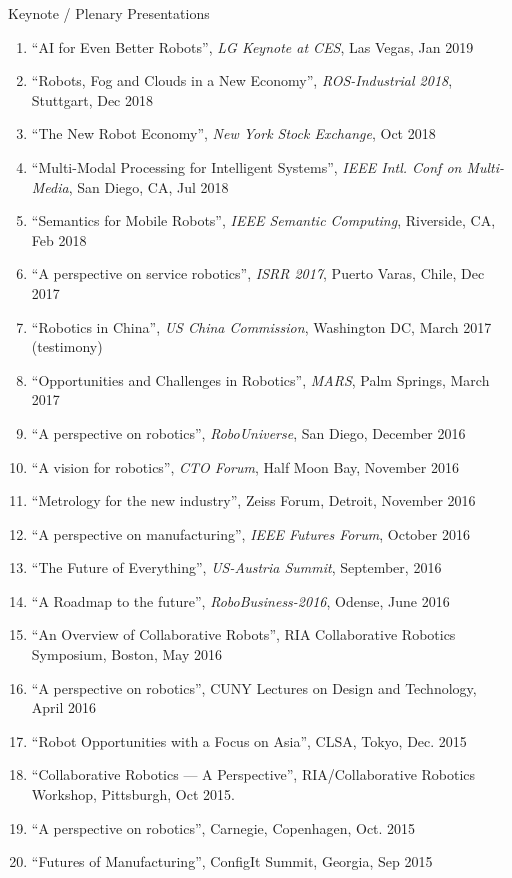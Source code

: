 \documentclass{article}
\begin{document}
\begin{cv}
\begin{cvlist}{Keynote / Plenary Presentations}
\begin{enumerate}
			\item ``AI for Even Better Robots'', {\em LG Keynote at CES}, Las Vegas, Jan 2019
			\item ``Robots, Fog and Clouds in a New Economy'', {\em ROS-Industrial 2018}, Stuttgart, Dec 2018
			\item ``The New Robot Economy'', {\em New York Stock Exchange}, Oct 2018
			\item ``Multi-Modal Processing for Intelligent Systems'', {\em IEEE Intl. Conf on Multi-Media},
			      San Diego, CA, Jul 2018
			\item ``Semantics for Mobile Robots'', {\em IEEE Semantic Computing}, Riverside, CA, Feb 2018
			\item ``A perspective on service robotics'', {\em ISRR 2017}, Puerto Varas, Chile, Dec 2017
			\item ``Robotics in China'', {\em US China Commission}, Washington DC, March 2017 (testimony)
			\item ``Opportunities and Challenges in Robotics'', {\em MARS}, Palm Springs, March 2017
			\item ``A perspective on robotics'', {\em RoboUniverse}, San Diego,  December 2016
			\item ``A vision for robotics'', {\em CTO Forum}, Half Moon Bay, November 2016
			\item ``Metrology for the new industry'', Zeiss Forum, Detroit,  November 2016
			\item ``A perspective on manufacturing'', {\em IEEE Futures Forum},  October 2016
			\item ``The Future of Everything'', {\em US-Austria Summit},  September, 2016
			\item ``A Roadmap to the future'', {\em RoboBusiness-2016}, Odense,  June 2016
			\item ``An Overview of Collaborative Robots'', RIA Collaborative Robotics Symposium, Boston, May 2016
			\item ``A perspective on robotics'', CUNY Lectures on Design and Technology, April 2016
			\item ``Robot Opportunities with a Focus on Asia'', CLSA, Tokyo,  Dec. 2015
			\item ``Collaborative Robotics --- A Perspective'', RIA/Collaborative Robotics Workshop, Pittsburgh, Oct 2015.
			\item ``A perspective on robotics'', Carnegie, Copenhagen, Oct. 2015
			\item ``Futures of Manufacturing'', ConfigIt Summit, Georgia, Sep 2015

\end{enumerate}
\end{cvlist}
\end{cv}
\end{document}
